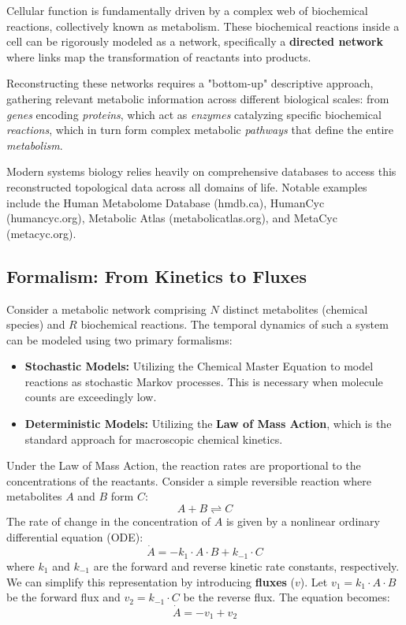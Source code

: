 Cellular function is fundamentally driven by a complex web of biochemical reactions, collectively known as metabolism. These biochemical reactions inside a cell can be rigorously modeled as a network, specifically a \textbf{directed network} where links map the transformation of reactants into products.

Reconstructing these networks requires a "bottom-up" descriptive approach, gathering relevant metabolic information across different biological scales: from \textit{genes} encoding \textit{proteins}, which act as \textit{enzymes} catalyzing specific biochemical \textit{reactions}, which in turn form complex metabolic \textit{pathways} that define the entire \textit{metabolism}.


Modern systems biology relies heavily on comprehensive databases to access this reconstructed topological data across all domains of life. Notable examples include the Human Metabolome Database (hmdb.ca), HumanCyc (humancyc.org), Metabolic Atlas (metabolicatlas.org), and MetaCyc (metacyc.org).

\subsection{Formalism: From Kinetics to Fluxes}
\label{subsec:kinetics_to_fluxes}

Consider a metabolic network comprising \(N\) distinct metabolites (chemical species) and \(R\) biochemical reactions. The temporal dynamics of such a system can be modeled using two primary formalisms:
\begin{itemize}
    \item \textbf{Stochastic Models:} Utilizing the Chemical Master Equation to model reactions as stochastic Markov processes. This is necessary when molecule counts are exceedingly low.
    \item \textbf{Deterministic Models:} Utilizing the \textbf{Law of Mass Action}, which is the standard approach for macroscopic chemical kinetics.
\end{itemize}

Under the Law of Mass Action, the reaction rates are proportional to the concentrations of the reactants. Consider a simple reversible reaction where metabolites \(A\) and \(B\) form \(C\):
\[
    A + B \rightleftharpoons C
\]
The rate of change in the concentration of \(A\) is given by a nonlinear ordinary differential equation (ODE):
\[
    \dot{A} = -k_1 \cdot A \cdot B + k_{-1} \cdot C
\]
where \(k_1\) and \(k_{-1}\) are the forward and reverse kinetic rate constants, respectively. We can simplify this representation by introducing \textbf{fluxes} (\(v\)). Let \(v_1 = k_1 \cdot A \cdot B\) be the forward flux and \(v_2 = k_{-1} \cdot C\) be the reverse flux. The equation becomes:
\[
    \dot{A} = -v_1 + v_2
\]


